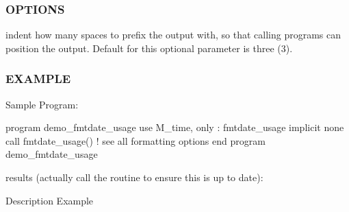 \subsubsection*{O\+P\+T\+I\+O\+NS}

indent how many spaces to prefix the output with, so that calling programs can position the output. Default for this optional parameter is three (3).

\subsubsection*{E\+X\+A\+M\+P\+LE}

\begin{DoxyVerb}Sample Program:

 program demo_fmtdate_usage
 use M_time, only : fmtdate_usage
 implicit none
    call fmtdate_usage() ! see all formatting options
 end program demo_fmtdate_usage

results (actually call the routine to ensure this is up to date):

 Description                                        Example


\end{DoxyVerb}
